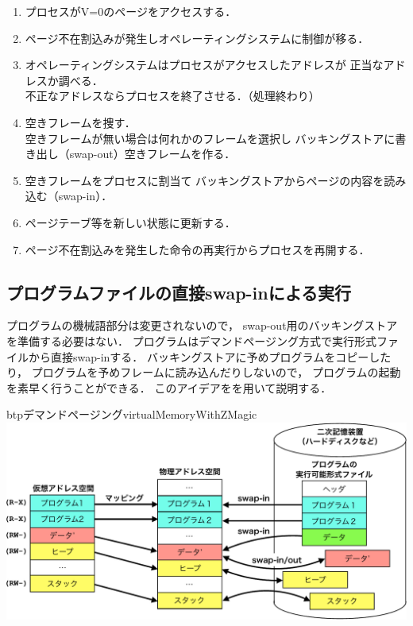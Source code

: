 \begin{enumerate}
\item プロセスがV=0のページをアクセスする．
\item ページ不在割込みが発生しオペレーティングシステムに制御が移る．
\item オペレーティングシステムはプロセスがアクセスしたアドレスが
  正当なアドレスか調べる．\\
  不正なアドレスならプロセスを終了させる．（処理終わり）
\item 空きフレームを捜す．\\
  空きフレームが無い場合は何れかのフレームを選択し
  バッキングストアに書き出し（swap-out）空きフレームを作る．
\item 空きフレームをプロセスに割当て
  バッキングストアからページの内容を読み込む（swap-in）．
\item ページテーブ等を新しい状態に更新する．
\item ページ不在割込みを発生した命令の再実行からプロセスを再開する．
\end{enumerate}

\subsection{プログラムファイルの直接swap-inによる実行}
プログラムの機械語部分は変更されないので，
swap-out用のバッキングストアを準備する必要はない．
プログラムはデマンドページング方式で実行形式ファイルから直接swap-inする．
バッキングストアに予めプログラムをコピーしたり，
プログラムを予めフレームに読み込んだりしないので，
プログラムの起動を素早く行うことができる．
このアイデアをを用いて説明する．

\begin{myfig}{btp}{デマンドページング}{virtualMemoryWithZMagic}
  \includegraphics[scale=0.66]{Fig/virtualMemoryWithZMagic-crop.pdf}
\end{myfig}

